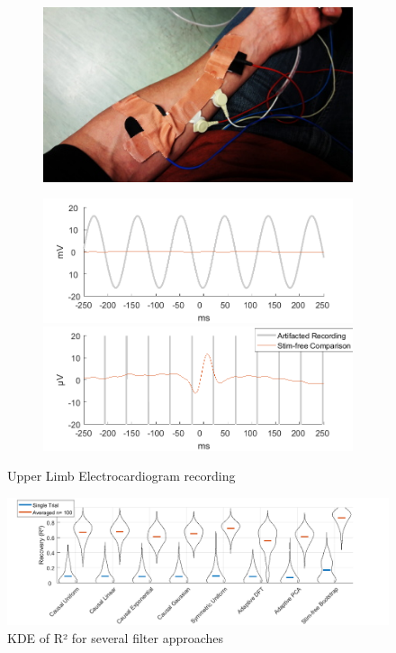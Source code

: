 \documentclass[a4paper]{article}
\begin{document}
\begin{figure}[hbtp]
    \begin{subfigure}{.45\textwidth}
        \includegraphics[width=\textwidth]{./img/div/upper_limb_ecg.jpg}
    \end{subfigure}
    \begin{subfigure}{.45\textwidth}
        \includegraphics[width=\textwidth]{./img/eva/ecg_raw_1.png}\\
        \includegraphics[width=\textwidth]{./img/eva/ecg_raw_2.png}
    \end{subfigure}
    \caption{Upper Limb Electrocardiogram recording}\label{fig:ecgRaw}
\end{figure}



\begin{figure}[hbtp]
    \includegraphics[width=\textwidth]{img/eva/ecg_R2.png}
    \caption{KDE of R² for several filter approaches}\label{fig:ecgR2}
\end{figure}
\end{document}
